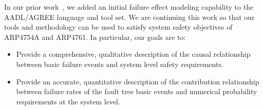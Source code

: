 
In our prior work~\cite{Stewart17:IMBSA}, we added an initial failure effect modeling capability to the AADL/AGREE language and tool set.  We are continuing this work so that our tools and methodology can be used to satisfy system safety objectives of ARP4754A and ARP4761.  In particular, our goals are to:

\begin{itemize}
	\item Provide a comprehensive, qualitative description of the causal relationship between basic failure events and system level safety requirements.
	\item Provide an accurate, quantitative description of the contribution relationship between failure rates of the fault tree basic events and numerical probability requirements at the system level.
\end{itemize}




